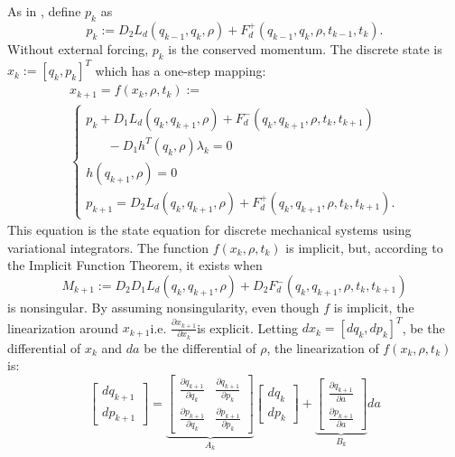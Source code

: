 \documentclass[letterpaper, 10pt, conference]{ieeeconf}
\begin{document}
As in \cite{johnson_murphey_scalable}, define $p_k$ as 
\begin{equation}
p_k := D_2 L_d(q_{k-1},q_{k},\rho) + F_d^+(q_{k-1},q_{k},\rho,t_{k-1},t_{k}).
\label{eq-pk}
\end{equation}
Without external forcing, $p_k$ is the conserved momentum.  The discrete state is $x_k := [q_k,p_k]^T$ which has a one-step mapping:
\begin{equation}
\begin{array}{l}
x_{k+1} = f(x_k,\rho,t_k):=\\\left\{\begin{array}{l}
p_k + D_1L_d(q_k,q_{k+1},\rho) + F_d^-(q_k,q_{k+1},\rho,t_k,t_{k+1}) \\\hspace{20pt} - D_1h^T(q_k,\rho)\lambda_k= 0 \\
h(q_{k+1},\rho) = 0\\
p_{k+1} = D_2 L_d(q_{k},q_{k+1},\rho) + F_d^+(q_{k},q_{k+1},\rho,t_{k},t_{k+1}).
\end{array}\right.
\end{array}
\label{eq-fk}
\end{equation}
This equation is the state equation for discrete mechanical systems using variational integrators.  The function $f(x_k,\rho,t_k)$ is implicit, but, according to the Implicit Function Theorem, it exists when
\[
M_{k+1}:=D_2D_1L_d(q_k,q_{k+1},\rho) + D_2F_d^-(q_k,q_{k+1},\rho,t_k,t_{k+1})
\]
is nonsingular.  By assuming nonsingularity, even though $f$ is implicit, the linearization around $x_{k+1}$\textemdash i.e. $\frac{\partial x_{k+1}}{\partial x_k}$\textemdash is explicit.  Letting $dx_k = [dq_k,dp_k]^T$, be the differential of $x_k$ and $da$ be the differential of $\rho$, the linearization of $f(x_k,\rho,t_k)$ is:
\begin{equation}
\left[\begin{array}{cc}dq_{k+1} \\ dp_{k+1} \end{array}\right]
 = \underbrace{\left[\begin{array}{cc}
\frac{\partial q_{k+1}}{\partial q_k} & \frac{\partial q_{k+1}}{\partial p_k} \\
\frac{\partial p_{k+1}}{\partial q_k} & \frac{\partial p_{k+1}}{\partial p_k} 
\end{array}\right]}_{A_k}
\left[\begin{array}{cc}dq_{k} \\ dp_k \end{array}\right] + \underbrace{\left[\begin{array}{cc}\frac{\partial q_{k+1}}{\partial a} \\ \frac{\partial p_{k+1}}{\partial a} \end{array}\right]}_{B_k}da
\label{eq-lin_fk}
\end{equation}
\end{document}
